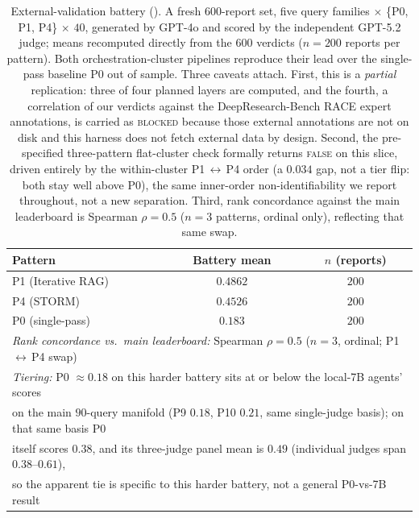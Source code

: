 \documentclass[11pt]{article}
\begin{document}
\begin{table}[H]\centering
\caption{External-validation battery (). A fresh $600$-report set, five
query families $\times$ \{P0, P1, P4\} $\times$ $40$, generated by GPT-4o and scored by the
independent GPT-5.2 judge; means recomputed directly from the $600$ verdicts ($n{=}200$ reports per
pattern). Both orchestration-cluster pipelines reproduce their lead over the single-pass baseline P0
out of sample. Three caveats attach. First, this is a \emph{partial} replication: three of four
planned layers are computed, and the fourth, a correlation of our verdicts against the
DeepResearch-Bench RACE expert annotations, is carried as \textsc{blocked} because those external
annotations are not on disk and this harness does not fetch external data by design. Second, the
pre-specified three-pattern flat-cluster check formally returns \textsc{false} on this slice,
driven entirely by the within-cluster P1\,$\leftrightarrow$\,P4 order (a $0.034$ gap, not a tier
flip: both stay well above P0), the same inner-order non-identifiability we report throughout, not
a new separation. Third, rank concordance against the main leaderboard is Spearman $\rho=0.5$
($n{=}3$ patterns, ordinal only), reflecting that same swap.}
\label{tab:extval}
\begin{tabular}{lcc}
\toprule
Pattern & Battery mean & $n$ (reports) \\
\midrule
P1 (Iterative RAG) & $0.4862$ & $200$ \\
P4 (STORM)         & $0.4526$ & $200$ \\
P0 (single-pass)   & $0.183$ & $200$ \\
\midrule
\multicolumn{3}{l}{\emph{Rank concordance vs.\ main leaderboard:} Spearman $\rho=0.5$ ($n{=}3$, ordinal; P1\,$\leftrightarrow$\,P4 swap)}\\
\multicolumn{3}{l}{\emph{Tiering:} P0 $\approx0.18$ on this harder battery sits at or below the local-7B agents' scores}\\
\multicolumn{3}{l}{\quad on the main $90$-query manifold (P9 $0.18$, P10 $0.21$, same single-judge basis); on that same basis P0}\\
\multicolumn{3}{l}{\quad itself scores $0.38$, and its three-judge panel mean is $0.49$ (individual judges span $0.38$--$0.61$),}\\
\multicolumn{3}{l}{\quad so the apparent tie is specific to this harder battery, not a general P0-vs-7B result}\\
\bottomrule
\end{tabular}
\end{table}
\end{document}
